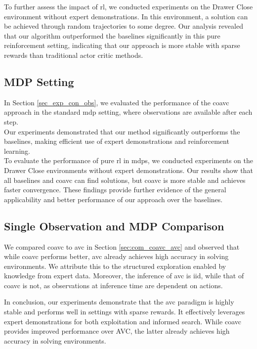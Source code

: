 To further assess the impact of \ac{rl}, we conducted experiments on the Drawer Close environment without expert demonstrations. 
In this environment, a solution can be achieved through random trajectories to some degree. 
Our analysis revealed that our algorithm outperformed the baselines significantly in this pure reinforcement setting, 
indicating that our approach is more stable with sparse rewards than traditional actor critic methods.\\




\subsection{MDP Setting}
In Section \ref{sec_exp_con_obs}, we evaluated the performance of the \ac{coavc} approach in the standard \ac{mdp} setting, 
where observations are available after each step.\\

Our experiments demonstrated that our method significantly outperforms the baselines, making efficient use of expert demonstrations and reinforcement learning.\\

To evaluate the performance of pure \ac{rl} in \ac{mdp}s, we conducted experiments on the Drawer Close 
environments without expert demonstrations. Our results show that all baselines and \ac{coavc} can find solutions, but \ac{coavc} is more stable and achieves 
faster convergence. These findings provide further evidence of the general applicability and better performance of our approach over the baselines. 

\subsection{Single Observation and MDP Comparison}
We compared \ac{coavc} to \ac{avc} in Section \ref{sec:com_coavc_avc} and observed that while \ac{coavc} performs better, 
\ac{avc} already achieves high accuracy in solving environments. We attribute this to the structured exploration enabled by knowledge from 
expert data. Moreover, the inference of \ac{avc} is \ac{iid}, while that of \ac{coavc} is not, as observations at inference time are dependent on actions. 

In conclusion, our experiments demonstrate that the \ac{avc} paradigm is highly stable and performs well in settings with sparse rewards. 
It effectively leverages expert demonstrations for both exploitation and informed search. While \ac{coavc} provides improved performance over 
AVC, the latter already achieves high accuracy in solving environments.

